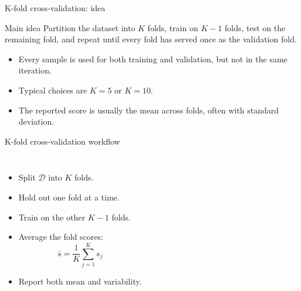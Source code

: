 \documentclass[12pt]{beamer}
\begin{document}
\begin{frame}{K-fold cross-validation: idea}
  \begin{conceptbox}{Main idea}
    Partition the dataset into $K$ folds, train on $K-1$ folds, test on the remaining fold,
    and repeat until every fold has served once as the validation fold.
  \end{conceptbox}
  \begin{itemize}
    \item Every sample is used for both training and validation, but not in the same iteration.
    \item Typical choices are $K=5$ or $K=10$.
    \item The reported score is usually the mean across folds, often with standard deviation.
  \end{itemize}
\end{frame}

\begin{frame}{K-fold cross-validation workflow}
  \begin{columns}[T]
      \centering
      \begin{itemize}
        \item Split $\mathcal{D}$ into $K$ folds.
        \item Hold out one fold at a time.
        \item Train on the other $K-1$ folds.
        \item Average the fold scores:
          \[
            \bar{s}=\frac{1}{K}\sum_{j=1}^{K}s_j
          \]
        \item Report both mean and variability.
      \end{itemize}
  \end{columns}
\end{frame}
\end{document}
